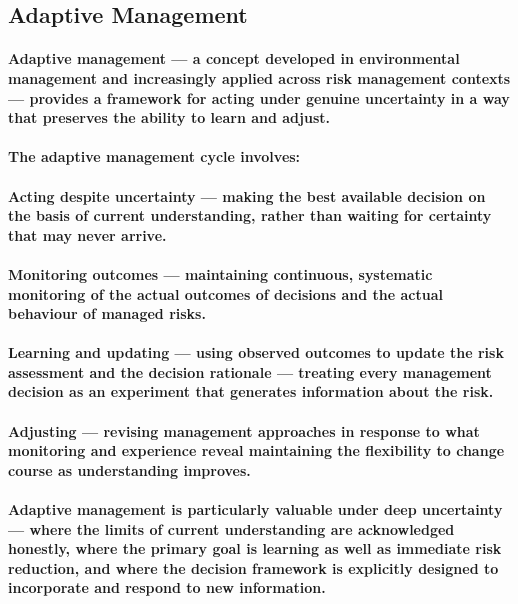 \subsection{Adaptive Management}
\paragraph{\textbf{Adaptive management} — a concept developed in environmental management and increasingly applied across risk management contexts — provides a framework for acting under genuine uncertainty in a way that preserves the ability to learn and adjust.}
\paragraph{The adaptive management cycle involves:}
\paragraph{\textbf{Acting despite uncertainty} — making the best available decision on the basis of current understanding, rather than waiting for certainty that may never arrive.}
\paragraph{\textbf{Monitoring outcomes} — maintaining continuous, systematic monitoring of the actual outcomes of decisions and the actual behaviour of managed risks.}
\paragraph{\textbf{Learning and updating} — using observed outcomes to update the risk assessment and the decision rationale — treating every management decision as an experiment that generates information about the risk.}
\paragraph{\textbf{Adjusting} — revising management approaches in response to what monitoring and experience reveal maintaining the flexibility to change course as understanding improves.}
\paragraph{Adaptive management is particularly valuable under deep uncertainty — where the limits of current understanding are acknowledged honestly, where the primary goal is learning as well as immediate risk reduction, and where the decision framework is explicitly designed to incorporate and respond to new information.}

